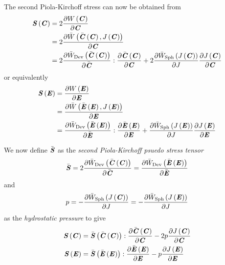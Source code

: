 The second Piola-Kirchoff stress can now be obtained from
\begin{equation}
  \begin{split}
    \fnof{\tensor{S}}{\tensor{C}} &= 2\delby{\fnof{W}{\tensor{C}}}{\tensor{C}} \\
    &=2\delby{\fnof{\bar{W}}{\fnof{\bar{\tensor{C}}}{\tensortwo{C}},\fnof{J}{\tensortwo{C}}}}{\tensor{C}}\\
    &=2\doubledotprod{
      \delby{\fnof{\bar{W}_{\Devop}}{\fnof{\bar{\tensor{C}}}{\tensortwo{C}}}}{\bar{\tensortwo{C}}}
    }{\delby{\fnof{\bar{\tensor{C}}}{\tensortwo{C}}}{\tensor{C}}}
      +2\delby{\fnof{\bar{W}_{\Sphop}}{\fnof{J}{\tensortwo{C}}}}{J}\delby{\fnof{J}{\tensortwo{C}}}{\tensor{C}}
  \end{split}
\end{equation}
or equivalently
\begin{equation}
  \begin{split}
    \fnof{\tensor{S}}{\tensor{E}} &= \delby{\fnof{W}{\tensor{E}}}{\tensor{E}} \\
    &=\delby{\fnof{\bar{W}}{\fnof{\bar{\tensor{E}}}{\tensortwo{E}},\fnof{J}{\tensortwo{E}}}}{\tensor{E}}\\
    &=\doubledotprod{\delby{\fnof{\bar{W}_{\Devop}}{\fnof{\bar{\tensor{E}}}{\tensortwo{E}}}}{\bar{\tensor{E}}}}{\delby{\fnof{\bar{\tensor{E}}}{\tensortwo{E}}}{\tensor{E}}}+\delby{\fnof{\bar{W}_{\Sphop}}{\fnof{J}{\tensortwo{E}}}}{J}\delby{\fnof{J}{\tensortwo{E}}}{\tensor{E}}
  \end{split}
\end{equation}

We now define $\bar{\tensor{S}}$ as the \emph{second Piola-Kirchoff psuedo
  stress tensor} \ie 
\begin{equation}
  \bar{\tensor{S}}=2\delby{\fnof{\bar{W}_{\Devop}}{\fnof{\bar{\tensor{C}}}{\tensortwo{C}}}}{\bar{\tensor{C}}}=\delby{\fnof{\bar{W}_{\Devop}}{\fnof{\bar{\tensor{E}}}{\tensortwo{E}}}}{\bar{\tensor{E}}}
\end{equation}
and
\begin{equation}
  p = -\delby{\fnof{\bar{W}_{\Sphop}}{\fnof{J}{\tensortwo{C}}}}{J}= -\delby{\fnof{\bar{W}_{\Sphop}}{\fnof{J}{\tensortwo{E}}}}{J}
\end{equation}
as the \emph{hydrostatic pressure} to give
\begin{align}
  \fnof{\tensor{S}}{\tensortwo{C}}
  &=\doubledotprod{\fnof{\bar{\tensor{S}}}{\fnof{\bar{\tensortwo{C}}}{\tensortwo{C}}}}{\delby{\fnof{\bar{\tensor{C}}}{\tensortwo{C}}}{\tensor{C}}}
  -2p\delby{\fnof{J}{\tensortwo{C}}}{\tensor{C}}
  \label{eqn:PK2StressC1} \\
  \fnof{\tensor{S}}{\tensortwo{E}}
  &=\doubledotprod{\fnof{\bar{\tensor{S}}}{\fnof{\bar{\tensortwo{E}}}{\tensortwo{E}}}}{\delby{\fnof{\bar{\tensor{E}}}{\tensortwo{E}}}{\tensor{E}}}
  -p\delby{\fnof{J}{\tensortwo{E}}}{\tensor{E}}
  \label{eqn:PK2StressE1}
\end{align}


